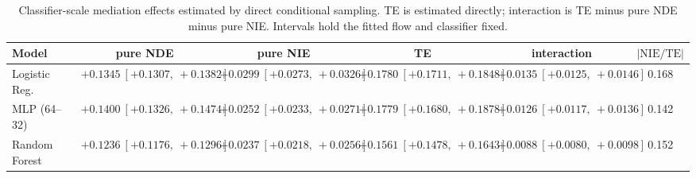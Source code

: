 \begin{table}[htbp]
  \centering
  \caption{Classifier-scale mediation effects estimated by direct conditional sampling. TE is estimated directly; interaction is TE minus pure NDE minus pure NIE. Intervals hold the fitted flow and classifier fixed.}
  \label{tab:adult_gap_overall}
  \begin{tabular}{lccccc}
    \toprule
    Model & pure NDE & pure NIE & TE & interaction & $|\mathrm{NIE}/\mathrm{TE}|$ \\
    \midrule
    Logistic Reg. & $+0.1345\ [+0.1307,\ +0.1382]$ & $+0.0299\ [+0.0273,\ +0.0326]$ & $+0.1780\ [+0.1711,\ +0.1848]$ & $+0.0135\ [+0.0125,\ +0.0146]$ & 0.168 \\
    MLP (64--32) & $+0.1400\ [+0.1326,\ +0.1474]$ & $+0.0252\ [+0.0233,\ +0.0271]$ & $+0.1779\ [+0.1680,\ +0.1878]$ & $+0.0126\ [+0.0117,\ +0.0136]$ & 0.142 \\
    Random Forest & $+0.1236\ [+0.1176,\ +0.1296]$ & $+0.0237\ [+0.0218,\ +0.0256]$ & $+0.1561\ [+0.1478,\ +0.1643]$ & $+0.0088\ [+0.0080,\ +0.0098]$ & 0.152 \\
    \bottomrule
  \end{tabular}
\end{table}